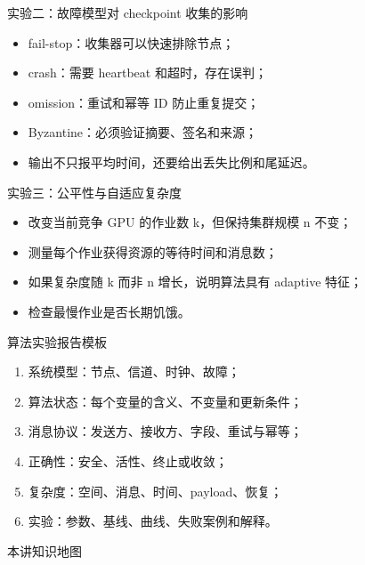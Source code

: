 \documentclass[UTF8,fontset=none,aspectratio=169,10pt]{beamer}
\begin{document}
\begin{frame}{实验二：故障模型对 checkpoint 收集的影响}
\begin{itemize}
  \item fail-stop：收集器可以快速排除节点；
  \item crash：需要 heartbeat 和超时，存在误判；
  \item omission：重试和幂等 ID 防止重复提交；
  \item Byzantine：必须验证摘要、签名和来源；
  \item 输出不只报平均时间，还要给出丢失比例和尾延迟。
\end{itemize}
\end{frame}

\begin{frame}{实验三：公平性与自适应复杂度}
\begin{itemize}
  \item 改变当前竞争 GPU 的作业数 k，但保持集群规模 n 不变；
  \item 测量每个作业获得资源的等待时间和消息数；
  \item 如果复杂度随 k 而非 n 增长，说明算法具有 adaptive 特征；
  \item 检查最慢作业是否长期饥饿。
\end{itemize}
\end{frame}


\begin{frame}{算法实验报告模板}
\begin{enumerate}
  \item 系统模型：节点、信道、时钟、故障；
  \item 算法状态：每个变量的含义、不变量和更新条件；
  \item 消息协议：发送方、接收方、字段、重试与幂等；
  \item 正确性：安全、活性、终止或收敛；
  \item 复杂度：空间、消息、时间、payload、恢复；
  \item 实验：参数、基线、曲线、失败案例和解释。
\end{enumerate}
\end{frame}

\begin{frame}{本讲知识地图}
\begin{center}
\end{center}
\end{frame}
\end{document}
